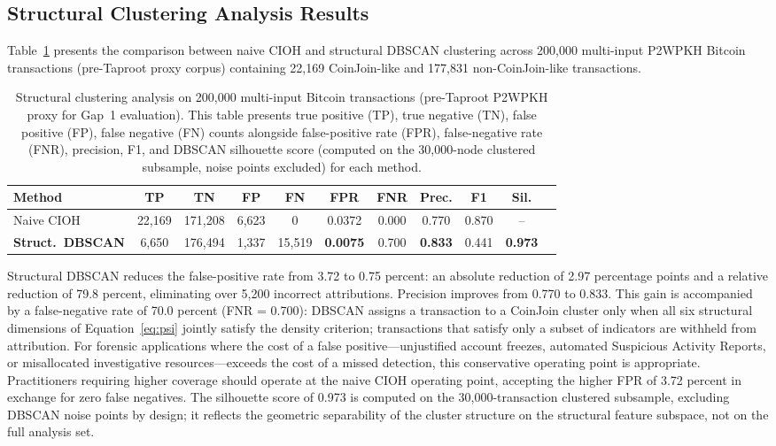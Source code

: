 \documentclass[12pt,a4paper]{article}
\begin{document}
\subsection{Structural Clustering Analysis Results}
\label{sec:taproot_results}

Table~\ref{tab:taproot} presents the comparison between
naive CIOH and structural DBSCAN clustering across
200,000 multi-input P2WPKH Bitcoin transactions
(pre-Taproot proxy corpus) containing 22,169 CoinJoin-like
and 177,831 non-CoinJoin-like transactions.

\begin{table}[htbp]
  \caption{Structural clustering analysis on 200,000
    multi-input Bitcoin transactions (pre-Taproot P2WPKH
    proxy for Gap~1 evaluation). This table presents
    true positive (TP), true negative (TN), false positive
    (FP), false negative (FN) counts alongside false-positive
    rate (FPR), false-negative rate (FNR), precision, F1,
    and DBSCAN silhouette score (computed on the 30,000-node
    clustered subsample, noise points excluded) for each
    method.}
  \label{tab:taproot}
  \centering
  \small
  \setlength{\tabcolsep}{3.5pt}
  \begin{tabular}{lcccccccccc}
    \toprule
    \textbf{Method}
      & \textbf{TP} & \textbf{TN}
      & \textbf{FP} & \textbf{FN}
      & \textbf{FPR} & \textbf{FNR}
      & \textbf{Prec.} & \textbf{F1}
      & \textbf{Sil.} \\
    \midrule
    Naive CIOH
      & 22,169 & 171,208 & 6,623 & 0
      & 0.0372 & 0.000 & 0.770 & 0.870 & -- \\
    \textbf{Struct.\ DBSCAN}
      & 6,650 & 176,494 & 1,337 & 15,519
      & \textbf{0.0075} & 0.700
      & \textbf{0.833} & 0.441 & \textbf{0.973} \\
    \bottomrule
  \end{tabular}
\end{table}

Structural DBSCAN reduces the false-positive rate from
3.72 to 0.75 percent: an absolute reduction of 2.97
percentage points and a relative reduction of 79.8 percent,
eliminating over 5,200 incorrect attributions. Precision
improves from 0.770 to 0.833. This gain is accompanied by
a false-negative rate of 70.0 percent (FNR = 0.700): DBSCAN
assigns a transaction to a CoinJoin cluster only when all
six structural dimensions of Equation~\eqref{eq:psi}
jointly satisfy the density criterion; transactions that
satisfy only a subset of indicators are withheld from
attribution. For forensic applications where the cost of
a false positive---unjustified account freezes, automated
Suspicious Activity Reports, or misallocated investigative
resources---exceeds the cost of a missed detection, this
conservative operating point is appropriate. Practitioners
requiring higher coverage should operate at the naive CIOH
operating point, accepting the higher FPR of 3.72 percent
in exchange for zero false negatives. The silhouette score
of 0.973 is computed on the 30,000-transaction clustered
subsample, excluding DBSCAN noise points by design;
it reflects the geometric separability of the cluster
structure on the structural feature subspace, not on
the full analysis set.
\end{document}
